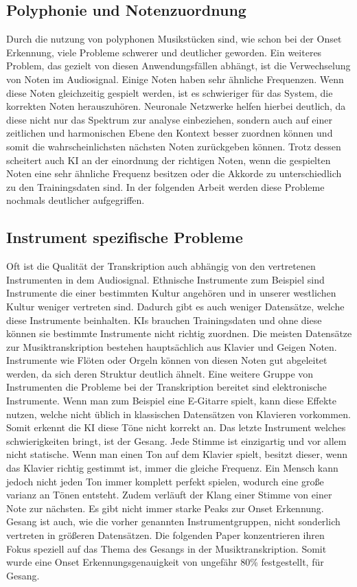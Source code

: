 \subsection{Polyphonie und Notenzuordnung}
Durch die nutzung von polyphonen Musikstücken sind, wie schon bei der Onset Erkennung,
viele Probleme schwerer und deutlicher geworden.
Ein weiteres Problem, das gezielt von diesen Anwendungsfällen abhängt, ist die Verwechselung von Noten im Audiosignal.
Einige Noten haben sehr ähnliche Frequenzen.
Wenn diese Noten gleichzeitig gespielt werden, ist es schwieriger für das System, die korrekten Noten herauszuhören.
Neuronale Netzwerke helfen hierbei deutlich, da diese nicht nur das Spektrum zur analyse einbeziehen,
sondern auch auf einer zeitlichen und harmonischen Ebene den Kontext besser zuordnen können
und somit die wahrscheinlichsten nächsten Noten zurückgeben können.
Trotz dessen scheitert auch KI an der einordnung der richtigen Noten, wenn die gespielten Noten
eine sehr ähnliche Frequenz besitzen oder die Akkorde zu unterschiedlich zu den Trainingsdaten sind.
In der folgenden Arbeit werden diese Probleme nochmals deutlicher aufgegriffen.
\cite{martak2022balancing}

\subsection{Instrument spezifische Probleme}
Oft ist die Qualität der Transkription auch abhängig von den vertretenen Instrumenten in dem Audiosignal.
Ethnische Instrumente zum Beispiel sind Instrumente die einer bestimmten Kultur angehören
und in unserer westlichen Kultur weniger vertreten sind.
Dadurch gibt es auch weniger Datensätze, welche diese Instrumente beinhalten.
KIs brauchen Trainingsdaten und ohne diese können sie bestimmte Instrumente nicht richtig zuordnen.
Die meisten Datensätze zur Musiktranskription bestehen hauptsächlich aus Klavier und Geigen Noten.
Instrumente wie Flöten oder Orgeln können von diesen Noten gut abgeleitet werden,
da sich deren Struktur deutlich ähnelt.
Eine weitere Gruppe von Instrumenten die Probleme bei der Transkription bereitet sind elektronische Instrumente.
Wenn man zum Beispiel eine E-Gitarre spielt, kann diese Effekte nutzen,
welche nicht üblich in klassischen Datensätzen von Klavieren vorkommen.
Somit erkennt die KI diese Töne nicht korrekt an.
Das letzte Instrument welches schwierigkeiten bringt, ist der Gesang.
Jede Stimme ist einzigartig und vor allem nicht statische.
Wenn man einen Ton auf dem Klavier spielt, besitzt dieser,
wenn das Klavier richtig gestimmt ist, immer die gleiche Frequenz.
Ein Mensch kann jedoch nicht jeden Ton immer komplett perfekt spielen, wodurch eine große varianz an Tönen entsteht.
Zudem verläuft der Klang einer Stimme von einer Note zur nächsten.
Es gibt nicht immer starke Peaks zur Onset Erkennung.
Gesang ist auch, wie die vorher genannten Instrumentgruppen, nicht sonderlich vertreten in größeren Datensätzen.
Die folgenden Paper konzentrieren ihren Fokus speziell auf das Thema des Gesangs in der Musiktranskription.
\cite{gu2023deep,gu2024automatic}
Somit wurde eine Onset Erkennungsgenauigkeit von ungefähr 80\% festgestellt, für Gesang.

